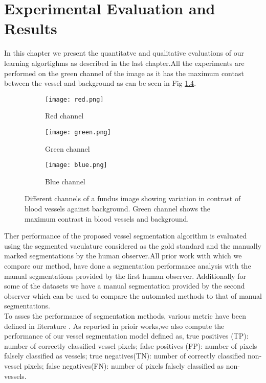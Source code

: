 \chapter{Experimental Evaluation and Results}  %

\ifpdf
    \graphicspath{{Chapter4/Figs/Raster/}{Chapter4/Figs/PDF/}{Chapter4/Figs/}}
\else
    \graphicspath{{Chapter4/Figs/Vector/}{Chapter4/Figs/}}
\fi

In this chapter we present the quantitatve and qualitative evaluations of our learning algortighms as described in the last chapter.All the experiments are performed on the green channel of the image as it has the maximum contast between the vessel and background as can be seen in Fig \ref{fig:fundus image}.\\
\begin{figure}
	\begin{subfigure}[b]{0.3\textwidth}
		\texttt{[image: red.png]}
		\caption{Red channel}
		\label{fig:red fundus}
	\end{subfigure}
	\begin{subfigure}[b]{0.3\textwidth}
		\texttt{[image: green.png]}
		\caption{Green channel}
		\label{fig:green fundus}
	\end{subfigure}
	\begin{subfigure}[b]{0.3\textwidth}
		\texttt{[image: blue.png]}
		\caption{Blue channel}
		\label{fig:blue fundus}
	\end{subfigure}
	\caption[Red, Gree, Blue channels of a fundus image]{Different channels of a fundus image showing variation in contrast of blood vessels against background. Green channel shows the maximum contrast in blood vessels and background.}
	\label{fig:fundus image}
\end{figure}

Ther performance of the proposed vessel segmentation algorithm is evaluated using the segmented vaculature considered as the gold standard and the manually marked segmentations by the human observer.All prior work with which we compare our method, have done a segmentation performance analysis with the manual segmentations provided by the first human observer. Additionally for some of the datasets we have a manual segmentation provided by the second observer which can be used to compare the automated methods to that of manual segmentations.\\

To asses the performance of segmentation methods, various metric have been defined in literature \cite{monteiro2006performance,sharma2001performance}. As reported in prioir works,we also compute the performance of our vessel segmentation model defined as, true positives (TP): number of correctly classified vessel pixels; false positives (FP): number of pixels falsely classified as vessels; true negatives(TN): number of correctly classified non-vessel pixels; false negatives(FN): number of pixels falsely classified as non-vessels.\\

